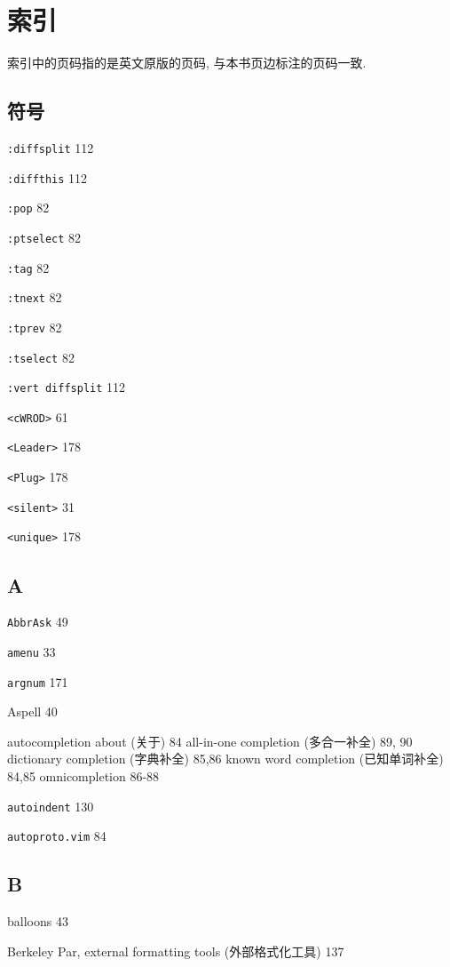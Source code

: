 \chapter{索引}
\label{chap:index}

索引中的页码指的是英文原版的页码, 与本书页边标注的页码一致.

\section{符号}

\texttt{:diffsplit} 112

\texttt{:diffthis} 112

\texttt{:pop} 82

\texttt{:ptselect} 82

\texttt{:tag} 82

\texttt{:tnext} 82

\texttt{:tprev} 82

\texttt{:tselect} 82

\texttt{:vert diffsplit} 112

\texttt{<cWROD>} 61

\texttt{<Leader>} 178

\texttt{<Plug>} 178

\texttt{<silent>} 31

\texttt{<unique>} 178

\section{A}

\texttt{AbbrAsk} 49

\texttt{amenu} 33

\texttt{argnum} 171

Aspell 40

autocompletion
  about (关于) 84
  all-in-one completion (多合一补全) 89, 90
  dictionary completion (字典补全) 85,86
  known word completion (已知单词补全) 84,85
  omnicompletion 86-88

\texttt{autoindent} 130

\texttt{autoproto.vim} 84

\section{B}

balloons 43

Berkeley Par, external formatting tools (外部格式化工具) 137

